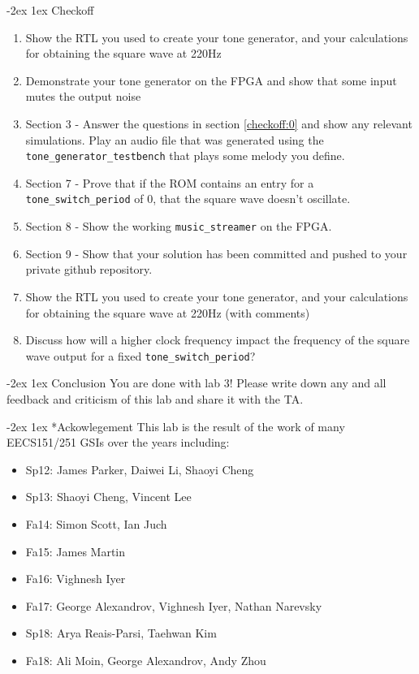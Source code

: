 \documentclass[11pt]{article}
\makeatletter
\renewcommand{\section}
{\@startsection {section}{1}{0pt}
 {-2ex}
 {1ex}
 {\bfseries\Large}}
\makeatother
\begin{document}
\section{Checkoff}
\begin{enumerate}
  \item Show the RTL you used to create your tone generator, and your calculations for obtaining the square wave at 220Hz
  \item Demonstrate your tone generator on the FPGA and show that some input mutes the output noise
  \item Section 3 - Answer the questions in section \ref{checkoff:0} and show any relevant simulations.  Play an audio file that was generated using the \verb|tone_generator_testbench| that plays some melody you define.
  \item Section 7 - Prove that if the ROM contains an entry for a \verb|tone_switch_period| of 0, that the square wave doesn't oscillate.
  \item Section 8 - Show the working \verb|music_streamer| on the FPGA.
  \item Section 9 - Show that your solution has been committed and pushed to your private github repository.
  \item Show the RTL you used to create your tone generator, and your calculations for obtaining the square wave at 220Hz (with comments)
  \item Discuss how will a higher clock frequency impact the frequency of the square wave output for a fixed \verb|tone_switch_period|?
\end{enumerate}

\section{Conclusion}
You are done with lab 3! Please write down any and all feedback and criticism of this lab and share it with the TA.

\section*{Ackowlegement}
This lab is the result of the work of many EECS151/251 GSIs over the years including:
\begin{itemize}
\item Sp12: James Parker, Daiwei Li, Shaoyi Cheng
\item Sp13: Shaoyi Cheng, Vincent Lee
\item Fa14: Simon Scott, Ian Juch
\item Fa15: James Martin
\item Fa16: Vighnesh Iyer
\item Fa17: George Alexandrov, Vighnesh Iyer, Nathan Narevsky
\item Sp18: Arya Reais-Parsi, Taehwan Kim
\item Fa18: Ali Moin, George Alexandrov, Andy Zhou
\end{itemize}
\end{document}
